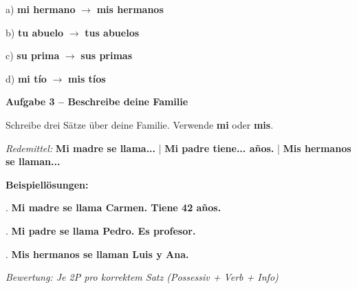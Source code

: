 \documentclass[11pt, a4paper]{article}
\newcommand{\fachfarbe}{spanisch}
\newcommand{\punktebox}[1]{\hfill\fbox{\small \_/#1}}
\newcommand{\lsg}[1]{\textcolor{loesung}{\textbf{#1}}}
\newenvironment{aufgabe}[1]{%
    \needspace{5\baselineskip}%
    \nopagebreak[4]%
    \vspace{10pt}
    \noindent\textbf{\textcolor{\fachfarbe}{Aufgabe #1}}
    \nopagebreak[4]%
    \vspace{5pt}
    \nopagebreak[4]%
    \begin{list}{}{\leftmargin=0pt}
    \item[]
}{%
    \end{list}
}
\newcommand{\es}[1]{\textcolor{\fachfarbe}{\textbf{#1}}}
\begin{document}
\noindent
a) \es{mi hermano} $\rightarrow$ \lsg{mis hermanos}

\vspace{0.8em}

\noindent
b) \es{tu abuelo} $\rightarrow$ \lsg{tus abuelos}

\vspace{0.8em}

\noindent
c) \es{su prima} $\rightarrow$ \lsg{sus primas}

\vspace{0.8em}

\noindent
d) \es{mi tío} $\rightarrow$ \lsg{mis tíos}

\vspace{15pt}


\begin{aufgabe}{3 -- Beschreibe deine Familie}
Schreibe drei Sätze über deine Familie. Verwende \es{mi} oder \es{mis}. \punktebox{6}
\end{aufgabe}

\begin{vokabelkasten}
\textit{Redemittel:} \es{Mi madre se llama...} | \es{Mi padre tiene... años.} | \es{Mis hermanos se llaman...}
\end{vokabelkasten}

\vspace{0.8em}

\textbf{Beispiellösungen:}

. \lsg{Mi madre se llama Carmen. Tiene 42 años.}

\vspace{1em}

. \lsg{Mi padre se llama Pedro. Es profesor.}

\vspace{1em}

. \lsg{Mis hermanos se llaman Luis y Ana.}

\vspace{0.5em}
\textit{\textcolor{grau}{Bewertung: Je 2P pro korrektem Satz (Possessiv + Verb + Info)}}

\vspace{15pt}

\end{document}
